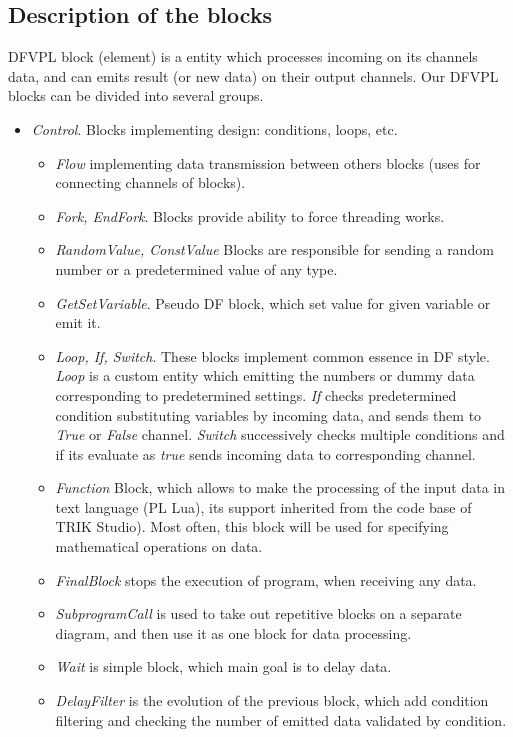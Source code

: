 \documentclass[conference,compsoc]{IEEEtran}
\begin{document}
\subsection{Description of the blocks}
DFVPL block (element) is a entity which processes incoming on its channels data, and can emits result (or new data) on their output channels. Our DFVPL blocks can be divided into several groups.

\begin{itemize}
\item \textit{Control}. Blocks implementing design: conditions, loops, etc.
\begin{itemize}
\item \textit{Flow} implementing data transmission between others blocks (uses for connecting channels of blocks).
\item \textit{Fork, EndFork}. Blocks provide ability to force threading works.
\item \textit{RandomValue, ConstValue} Blocks are responsible for sending a random number or a predetermined value of any type.
\item \textit{GetSetVariable}. Pseudo DF block, which set value for given variable or emit it.
\item \textit{Loop, If, Switch}. These blocks implement common essence in DF style. \textit{Loop} is a custom entity which emitting the numbers or dummy data corresponding to predetermined settings. \textit{If} checks predetermined condition substituting variables by incoming data, and sends them to \textit{True} or \textit{False} channel. \textit{Switch} successively checks multiple conditions and if its evaluate as \textit{true} sends incoming data to corresponding channel.  	
\item \textit{Function} Block, which allows to make the processing of the input data in text language (PL Lua\cite{lua}), its support inherited from the code base of TRIK Studio). Most often, this block will be used for specifying mathematical operations on data.
\item \textit{FinalBlock} stops the execution of program, when receiving any data. 
\item \textit{SubprogramCall} is used to take out repetitive blocks on a separate diagram, and then use it as one block for data processing.
\item \textit{Wait} is simple block, which main goal is to delay data.
\item \textit{DelayFilter} is the evolution of the previous block, which add condition filtering and checking the number of emitted data validated by condition.

\end{itemize}
\end{itemize}
\end{document}
